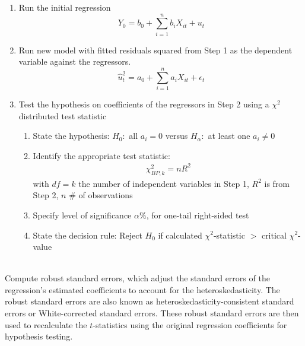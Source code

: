 \begin{definition} 
\begin{enumerate}[label=\arabic*.]
\setlength{\itemsep}{0pt}
\item Run the initial regression
\begin{equation}
Y_0 = b_0 + \sum\limits_{i=1}^n b_{i} X_{it} + u_t \nonumber
\end{equation}
\item Run new model with fitted residuals squared from Step 1 as the dependent variable against the regressors.
\begin{equation}
\hat{u}_{t}^2 = a_0 + \sum\limits_{i=1}^n a_{i} X_{it} + \epsilon_t \nonumber
\end{equation}
\item Test the hypothesis on coefficients of the regressors in Step 2 using a $\chi^2$ distributed test statistic
\begin{enumerate}[label=\roman*.]
\setlength{\itemsep}{0pt}
\item State the hypothesis: $H_0:$ all $a_i = 0$ versus $H_{\alpha}:$ at least one $a_i \neq 0$
\item Identify the appropriate test statistic:
\begin{align}
\chi^2_{BP, k} = nR^2 \nonumber
\end{align}
with $df = k$ the number of independent variables in Step 1, $R^2$ is from Step 2, $n$ $\#$ of observations
\item Specify level of significance $\alpha \%$, for one-tail right-sided test
\item State the decision rule: Reject $H_0$ if calculated $\chi^2$-statistic $>$ critical $\chi^2$-value
\end{enumerate}
\end{enumerate}
\end{definition}

\begin{remark} \\
Compute robust standard errors, which adjust the standard errors of the regression’s estimated coefficients to account for the heteroskedasticity. The robust standard errors are also known as heteroskedasticity-consistent standard errors or White-corrected standard errors. These robust standard errors are then used to recalculate the $t$-statistics using the original regression coefficients for hypothesis testing.
\end{remark}

